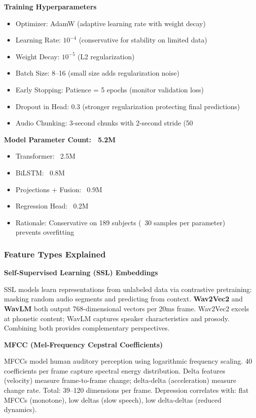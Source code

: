 \documentclass[12pt]{article}
\begin{document}
	\textbf{Training Hyperparameters}
	\begin{itemize}
		\item Optimizer: AdamW (adaptive learning rate with weight decay)
		\item Learning Rate: $10^{-4}$ (conservative for stability on limited data)
		\item Weight Decay: $10^{-5}$ (L2 regularization)
		\item Batch Size: 8--16 (small size adds regularization noise)
		\item Early Stopping: Patience = 5 epochs (monitor validation loss)
		\item Dropout in Head: 0.3 (stronger regularization protecting final predictions)
		\item Audio Chunking: 3-second chunks with 2-second stride (50%
	\end{itemize}

	\textbf{Model Parameter Count: ~5.2M}
	\begin{itemize}
		\item Transformer: ~2.5M
		\item BiLSTM: ~0.8M
		\item Projections + Fusion: ~0.9M
		\item Regression Head: ~0.2M
		\item Rationale: Conservative on 189 subjects (~30 samples per parameter) prevents overfitting
	\end{itemize}

	\subsubsection{Feature Types Explained}

	\textbf{Self-Supervised Learning (SSL) Embeddings}

	SSL models learn representations from unlabeled data via contrastive pretraining: masking random audio segments and predicting from context. \textbf{Wav2Vec2} and \textbf{WavLM} both output 768-dimensional vectors per 20ms frame. Wav2Vec2 excels at phonetic content; WavLM captures speaker characteristics and prosody. Combining both provides complementary perspectives.

	\textbf{MFCC (Mel-Frequency Cepstral Coefficients)}

	MFCCs model human auditory perception using logarithmic frequency scaling. 40 coefficients per frame capture spectral energy distribution. Delta features (velocity) measure frame-to-frame change; delta-delta (acceleration) measure change rate. Total: 39--120 dimensions per frame. Depression correlates with: flat MFCCs (monotone), low deltas (slow speech), low delta-deltas (reduced dynamics).
\end{document}
